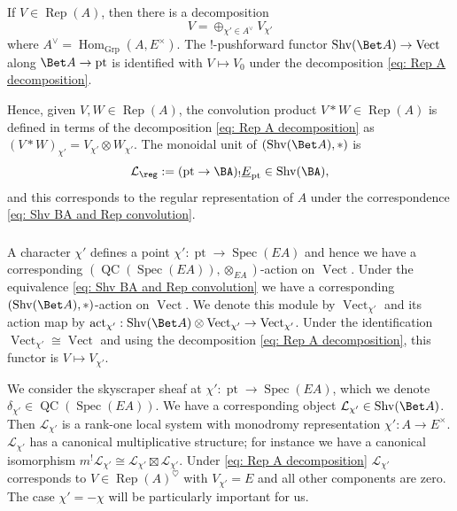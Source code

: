 \documentclass[10pt]{amsart}
\newcommand{\sssec}{\subsubsection}
\theoremstyle{remark}
\newcommand{\ul}{\underline}
\newcommand{\on}{\operatorname}
\newcommand{\cL}{\mathcal{L}}
\newcommand{\Rep}{\on{Rep}}
\newcommand{\Vect}{\on{Vect}}
\newcommand{\QC}{\on{QC}}
\newcommand{\Shv}{\on{Shv}}
\DeclareMathOperator{\Hom}{Hom}
\newcommand{\pt}{\on{pt}}
\DeclareMathOperator{\Spec}{Spec}
\begin{document}
\sssec{}\label{sssec: L reg}
If $V\in \Rep(A)$, then there is a decomposition
\begin{equation}\label{eq: Rep A decomposition}
    V=\oplus_{\chi'\in A^{\vee}} V_{\chi'}
\end{equation}
where $A^{\vee}=\Hom_{\on{Grp}}(A,E^{\times})$.
The $!$-pushforward functor $\Shv(\Bet A)\rightarrow\Vect$ along $\Bet A\rightarrow\pt$ is identified with $V\mapsto V_0$ under the decomposition \eqref{eq: Rep A decomposition}. 
\medskip

Hence, given $V,W\in\Rep(A)$, the convolution product $V\ast W\in \Rep(A)$ is defined in terms of the decomposition \eqref{eq: Rep A decomposition} as
$(V\ast W)_{\chi'}= V_{\chi'}\otimes W_{\chi'}$. The monoidal unit of $(\Shv(\Bet A),\ast)$ is
\[\cL_{\reg}:=(\pt\rightarrow\BA)_! \ul{E}_{\pt} \in \Shv(\BA),\]
and this corresponds to the regular representation of $A$ under the correspondence \eqref{eq: Shv BA and Rep convolution}. 


\sssec{}\label{sssec: Vect chi}
A character $\chi'$ defines a point $\chi':\pt\rightarrow \Spec(EA)$ and hence we have a corresponding $(\QC(\Spec(EA)),\otimes_{EA})$-action on $\Vect$.
Under the equivalence \eqref{eq: Shv BA and Rep convolution} we have a corresponding $(\Shv(\Bet A),\ast)$-action on $\Vect$. We denote this module by $\Vect_{\chi'}$ and its action map by
$\on{act}_{\chi'}: \Shv(\Bet A)\otimes \Vect_{\chi'}\rightarrow \Vect_{\chi'}$. Under the identification $\Vect_{\chi'}\cong\Vect$ and using the decomposition \eqref{eq: Rep A decomposition}, this functor is $V\mapsto V_{\chi'}$. 
\medskip

We consider the skyscraper sheaf at $\chi': \pt\rightarrow \Spec(EA)$, which we denote $\delta_{\chi'}\in \QC(\Spec(EA))$. We have a corresponding object $\cL_{\chi'} \in \Shv(\Bet A)$. Then $\cL_{\chi'}$ is a rank-one local system with monodromy representation $\chi': A\rightarrow E^{\times}$. $\cL_{\chi'}$ has a canonical multiplicative structure; for instance we have a canonical isomorphism $m^!\cL_{\chi'}\cong\cL_{\chi'}\boxtimes\cL_{\chi'}$.  Under \eqref{eq: Rep A decomposition} $\cL_{\chi'}$ corresponds to $V\in\Rep(A)^{\heartsuit}$ with $V_{\chi'}=E$ and all other components are zero. The case $\chi'=-\chi$ will be particularly important for us.
\end{document}
